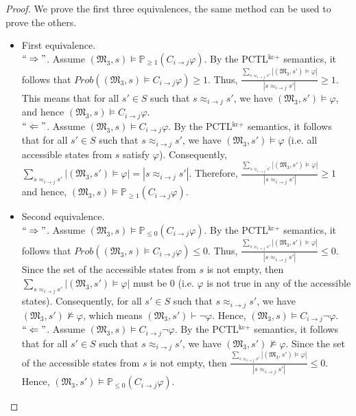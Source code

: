 \begin{proof}
We prove the first three equivalences, the same method can be used to prove the others.

\begin{itemize}
\item First equivalence. ~\\
    $``\Rightarrow"$. Assume $(\mathfrak{M_3},s)\models \mathbb{P}_{\geq1} (C_{i \rightarrow j}\varphi)$.
    By the PCTL$^{\textrm{kc+}}$ semantics, it follows that $Prob((\mathfrak{M_3},s)\models C_{i\rightarrow j}\varphi)\geq1$.
    Thus,  $\frac{\sum_{s\approx_{i \rightarrow j}s'}|(\mathfrak{M_3},s')\models \varphi| }{|s\approx_{i \rightarrow j}s'|}\geq1$.
    This means that for all $s'\in S$ such that $s\approx_{i \rightarrow j}s'$, we have $(\mathfrak{M_3},s')\models \varphi$, and hence $(\mathfrak{M_3},s) \models C_{i\rightarrow j}\varphi$. \\
    $``\Leftarrow"$. Assume $(\mathfrak{M_3},s)\models C_{i \rightarrow j}\varphi$. By the PCTL$^{\textrm{kc+}}$ semantics, it follows that for all $s'\in S$ such that $s\approx_{i \rightarrow j}s'$,
    we have $(\mathfrak{M_3},s')\models \varphi$ (i.e. all accessible states from $s$ satisfy $\varphi$).
    Consequently, $\sum_{s\approx_{i \rightarrow j}s'}|(\mathfrak{M_3},s')\models \varphi| = |s\approx_{i \rightarrow j}s'|$.
    Therefore, $\frac{\sum_{s\approx_{i \rightarrow j}s'}|(\mathfrak{M_3},s')\models \varphi| }{|s\approx_{i \rightarrow j}s'|}\geq1$
    and hence, $(\mathfrak{M_3},s)\models \mathbb{P}_{\geq1} (C_{i \rightarrow j}\varphi)$.

\item Second equivalence. ~\\
    $``\Rightarrow"$. Assume $(\mathfrak{M_3},s)\models \mathbb{P}_{\leq0} (C_{i \rightarrow j}\varphi)$.
    By the PCTL$^{\textrm{kc+}}$ semantics, it follows that $Prob((\mathfrak{M_3},s)\models C_{i\rightarrow j}\varphi)\leq0$.
    Thus, $\frac{\sum_{s\approx_{i \rightarrow j}s'}|(\mathfrak{M_3},s')\models \varphi|}{|s\approx_{i \rightarrow j}s'|}\leq0$.
    Since the set of the accessible states from $s$ is not empty, then $\sum_{s\approx_{i \rightarrow j}s'}|(\mathfrak{M_3},s')\models \varphi|$
    must be 0 (i.e. $\varphi$ is not true in any of the accessible states). Consequently, for all $s'\in S$ such that $s\approx_{i \rightarrow j}s'$, we have $(\mathfrak{M_3},s')\nvDash \varphi$, which means $(\mathfrak{M_3},s')\vdash \neg \varphi$.
     Hence, $(\mathfrak{M_3},s)\models C_{i\rightarrow j}\neg \varphi$.~\\
%
    $``\Leftarrow"$. Assume $(\mathfrak{M_3},s)\models C_{i \rightarrow j}\neg \varphi$. By the PCTL$^{\textrm{kc+}}$ semantics,
    it follows that for all $s'\in S$ such that
    $s\approx_{i \rightarrow j}s'$, we have $(\mathfrak{M_3},s')\nvDash \varphi$. Since the set of the accessible states from $s$ is not empty, then $\frac{\sum_{s\approx_{i \rightarrow j}s'}|(\mathfrak{M_3},s')\models \varphi| }{|s\approx_{i \rightarrow j}s'|}\leq0$. Hence, $(\mathfrak{M_3},s')\models \mathbb{P}_{\leq0} (C_{i \rightarrow j}\varphi)$.


\end{itemize}
\end{proof}
